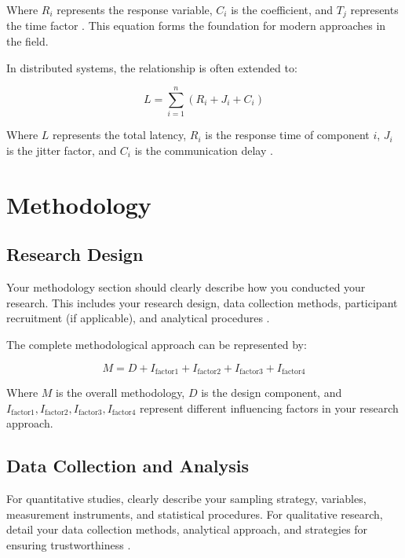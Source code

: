 \documentclass[11pt]{article}
\begin{document}
Where $R_i$ represents the response variable, $C_i$ is the coefficient, and $T_j$ represents the time factor \cite{wilson2021theoretical}. This equation forms the foundation for modern approaches in the field.

In distributed systems, the relationship is often extended to:

\begin{equation}
L = \sum_{i=1}^n (R_i + J_i + C_i)
\end{equation}

Where $L$ represents the total latency, $R_i$ is the response time of component $i$, $J_i$ is the jitter factor, and $C_i$ is the communication delay \cite{brown2018review}.

\section{Methodology}
\label{sec:methodology}

\subsection{Research Design}

Your methodology section should clearly describe how you conducted your research. This includes your research design, data collection methods, participant recruitment (if applicable), and analytical procedures \cite{johnson2019methods}.

The complete methodological approach can be represented by:

\begin{equation}
M = D + I_{\text{factor1}} + I_{\text{factor2}} + I_{\text{factor3}} + I_{\text{factor4}}
\end{equation}

Where $M$ is the overall methodology, $D$ is the design component, and $I_{\text{factor1}}, I_{\text{factor2}}, I_{\text{factor3}}, I_{\text{factor4}}$ represent different influencing factors in your research approach.

\subsection{Data Collection and Analysis}

For quantitative studies, clearly describe your sampling strategy, variables, measurement instruments, and statistical procedures. For qualitative research, detail your data collection methods, analytical approach, and strategies for ensuring trustworthiness \cite{garcia2020qualitative}.
\end{document}
